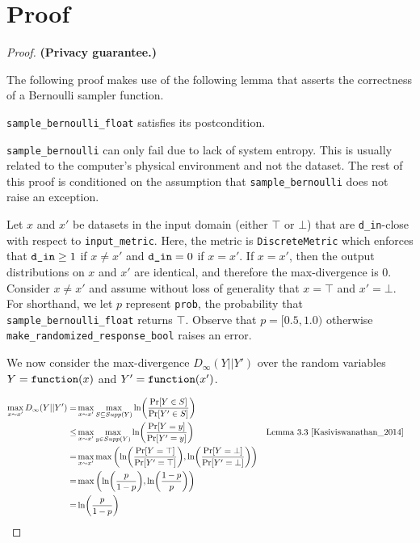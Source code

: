 \documentclass{article}
\begin{document}
\section{Proof} 
 
\begin{proof}  
\textbf{(Privacy guarantee.)}  
 
\begin{tcolorbox} 
\begin{note} 
    The following proof makes use of the following lemma that asserts the correctness of a Bernoulli sampler function. 
    \begin{lemma} 
        \texttt{sample\_bernoulli\_float} satisfies its postcondition. 
    \end{lemma} 
\end{note} 
\end{tcolorbox} 
 
\texttt{sample\_bernoulli} can only fail due to lack of system entropy.  
This is usually related to the computer's physical environment and not the dataset.  
The rest of this proof is conditioned on the assumption that \texttt{sample\_bernoulli} does not raise an exception.  
 
Let $x$ and $x'$ be datasets in the input domain (either $\top$ or $\bot$) that are \texttt{d\_in}-close with respect to \texttt{input\_metric}. 
Here, the metric is \texttt{DiscreteMetric} which enforces that $\texttt{d\_in} \geq 1$ if $x \ne x'$ and $\texttt{d\_in} = 0$ if $x = x'$.  
If $x = x'$, then the output distributions on $x$ and $x'$ are identical, and therefore the max-divergence is 0. 
Consider $x \ne x'$ and assume without loss of generality that $x = \top$ and $x' = \bot$.  
For shorthand, we let $p$ represent \texttt{prob}, the probability that \texttt{sample\_bernoulli\_float} returns $\top$.  
Observe that $p = [0.5, 1.0)$ otherwise \texttt{make\_randomized\_response\_bool} raises an error.  
 
We now consider the max-divergence $D_{\infty}(Y||Y')$ over the random variables $Y = \texttt{function}(x)$ and $Y' = \texttt{function}(x')$. 
 
\begin{align*} 
    \max_{x \sim x'} D_{\infty}(Y||Y') 
    =& \max_{x \sim x'} \max_{S \subseteq Supp(Y)}\ln (\frac{\Pr[Y \in S]}{\Pr[Y' \in S]}) \\ 
    \le& \max_{x \sim x'} \max_{y \in Supp(Y)}\ln (\frac{\Pr[Y = y]}{\Pr[Y' = y]}) &&\text{Lemma 3.3 } \cite{Kasiviswanathan_2014} \\ 
    =& \max_{x \sim x'} \max\left(\ln (\frac{\Pr[Y = \top]}{\Pr[Y' = \top]}), \ln(\frac{\Pr[Y = \bot]}{\Pr[Y' = \bot]})\right) \\ 
    =& \max\left(\ln (\frac{p}{1 - p}), \ln(\frac{1 - p}{p})\right) \\ 
    =& \ln (\frac{p}{1 - p}) 
\end{align*} 
 

\end{proof}
\end{document}
